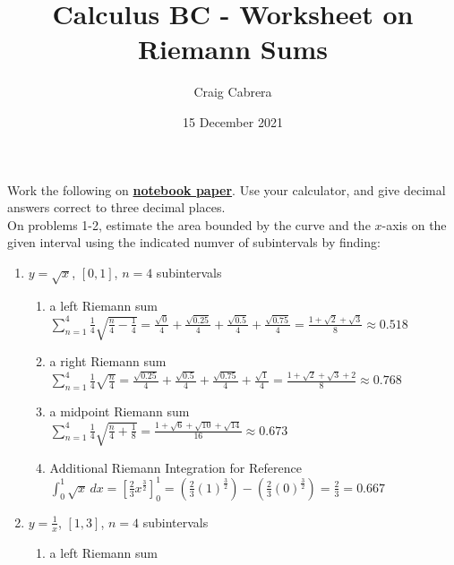 \documentclass[10pt, letterpaper]{report}
\title{Calculus BC - Worksheet on Riemann Sums}
\author{Craig Cabrera}
\date{15 December 2021}
\begin{document}
\maketitle
Work the following on \textbf{\underline{notebook paper}}. Use your calculator, and give decimal answers correct to three decimal places. \\

On problems 1-2, estimate the area bounded by the curve and the $x$-axis on the given interval using the indicated numver of subintervals by finding:

\begin{enumerate}
  \item{$y=\sqrt{x}$, $[0,1]$, $n=4$ subintervals}
    \begin{enumerate}
      \item{a left Riemann sum} \\

        $\sum_{n=1}^{4}\frac{1}{4}\sqrt{\frac{n}{4}-\frac{1}{4}}=\frac{\sqrt{0}}{4}+\frac{\sqrt{0.25}}{4}+\frac{\sqrt{0.5}}{4}+\frac{\sqrt{0.75}}{4}=
        \frac{1+\sqrt{2}+\sqrt{3}}{8}\approx0.518$ \\

      \item{a right Riemann sum} \\

        $\sum_{n=1}^{4}\frac{1}{4}\sqrt{\frac{n}{4}}=
        \frac{\sqrt{0.25}}{4}+\frac{\sqrt{0.5}}{4}+\frac{\sqrt{0.75}}{4}+\frac{\sqrt{1}}{4}=
        \frac{1+\sqrt{2}+\sqrt{3}+2}{8}\approx0.768$ \\

      \item{a midpoint Riemann sum} \\

        $\sum_{n=1}^{4}\frac{1}{4}\sqrt{\frac{n}{4}+\frac{1}{8}}=
        \frac{1+\sqrt{6}+\sqrt{10}+\sqrt{14}}{16}\approx0.673$ \\

      \item{Additional Riemann Integration for Reference} \\

        $\int_{0}^{1}\sqrt{x}\,dx=
        [\frac{2}{3}x^{\frac{3}{2}}]_{0}^{1}=
        (\frac{2}{3}(1)^{\frac{3}{2}})-(\frac{2}{3}(0)^{\frac{3}{2}})=
        \frac{2}{3}=0.667$ \\

    \end{enumerate}
  \item{$y=\frac{1}{x}$, $[1,3]$, $n=4$ subintervals}
    \begin{enumerate}
      \item{a left Riemann sum} \\


\end{enumerate}
\end{enumerate}
\end{document}
